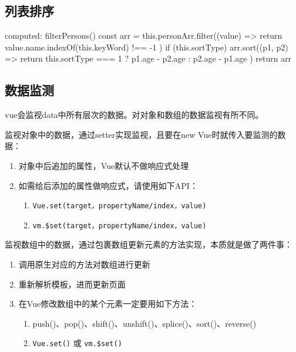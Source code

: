\subsection{列表排序}
\begin{js}
computed: {
    filterPersons() {
        const arr = this.personArr.filter((value) => {
            return value.name.indexOf(this.keyWord) !== -1
        })
        if (this.sortType) {
            arr.sort((p1, p2) => {
                return this.sortType === 1 ? p1.age - p2.age : p2.age - p1.age
            })
        }
        return arr
    }
}
\end{js}
\subsection{数据监测}
vue会监视data中所有层次的数据。对对象和数组的数据监视有所不同。

监视对象中的数据，通过setter实现监视，且要在new Vue时就传入要监测的数据：
\begin{enumerate}
    \item 对象中后追加的属性，Vue默认不做响应式处理
    \item 如需给后添加的属性做响应式，请使用如下API：
    \begin{enumerate}
        \item \verb|Vue.set(target，propertyName/index，value)|
        \item \verb|vm.$set(target，propertyName/index，value)|
    \end{enumerate}
\end{enumerate}

监视数组中的数据，通过包裹数组更新元素的方法实现，本质就是做了两件事：
\begin{enumerate}
    \item 调用原生对应的方法对数组进行更新
    \item 重新解析模板，进而更新页面
    \item 在Vue修改数组中的某个元素一定要用如下方法：
    \begin{enumerate}
        \item push()、pop()、shift()、unshift()、splice()、sort()、reverse()
        \item \verb|Vue.set()| 或 \verb|vm.$set()|
    \end{enumerate}
\end{enumerate}



